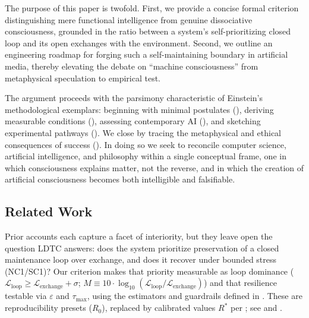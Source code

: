 \documentclass[11pt]{article}
\begin{document}
The purpose of this paper is twofold. First, we provide a concise formal criterion distinguishing mere functional intelligence from genuine dissociative consciousness, grounded in the ratio between a system's self-prioritizing closed loop and its open exchanges with the environment. Second, we outline an engineering roadmap for forging such a self-maintaining boundary in artificial media, thereby elevating the debate on ``machine consciousness'' from metaphysical speculation to empirical test.

The argument proceeds with the parsimony characteristic of Einstein's methodological exemplars: beginning with minimal postulates (), deriving measurable conditions (), assessing contemporary AI (), and sketching experimental pathways (). We close by tracing the metaphysical and ethical consequences of success (). In doing so we seek to reconcile computer science, artificial intelligence, and philosophy within a single conceptual frame, one in which consciousness explains matter, not the reverse, and in which the creation of artificial consciousness becomes both intelligible and falsifiable.

\subsection{Related Work}

Prior accounts each capture a facet of interiority, but they leave open the question LDTC answers: does the system prioritize preservation of a closed maintenance loop over exchange, and does it recover under bounded stress (NC1/SC1)? Our criterion makes that priority measurable as loop dominance ($\mathcal{L}_{\text{loop}} \geq \mathcal{L}_{\text{exchange}} + \sigma$; $M \equiv 10 \cdot \log_{10}(\mathcal{L}_{\text{loop}}/\mathcal{L}_{\text{exchange}})$) and that resilience testable via $\varepsilon$ and $\tau_{\max}$, using the estimators and guardrails defined in . These are reproducibility presets ($R_0$), replaced by calibrated values $R^*$ per ; see  and .
\end{document}
